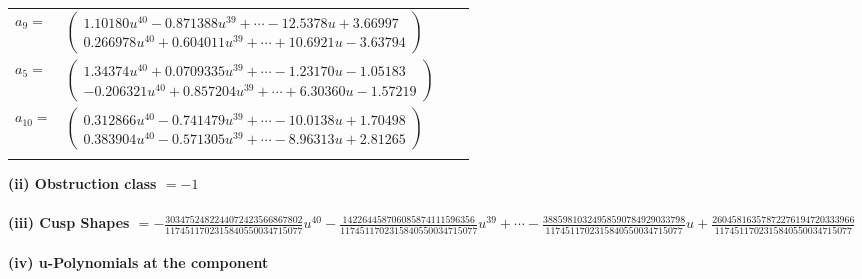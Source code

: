 \documentclass[1p]{elsarticle_modified}
\theoremstyle{definition}
\begin{document}
\begin{tabular}{m{7pt} m{180pt} m{7pt} m{180pt} }
\flushright $a_{9}=$&$\begin{pmatrix}1.10180 u^{40}-0.871388 u^{39}+\cdots-12.5378 u+3.66997\\0.266978 u^{40}+0.604011 u^{39}+\cdots+10.6921 u-3.63794\end{pmatrix}$ \\
\flushright $a_{5}=$&$\begin{pmatrix}1.34374 u^{40}+0.0709335 u^{39}+\cdots-1.23170 u-1.05183\\-0.206321 u^{40}+0.857204 u^{39}+\cdots+6.30360 u-1.57219\end{pmatrix}$ \\
\flushright $a_{10}=$&$\begin{pmatrix}0.312866 u^{40}-0.741479 u^{39}+\cdots-10.0138 u+1.70498\\0.383904 u^{40}-0.571305 u^{39}+\cdots-8.96313 u+2.81265\end{pmatrix}$\\&\end{tabular}
\flushleft \textbf{(ii) Obstruction class $= -1$}\\~\\
\flushleft \textbf{(iii) Cusp Shapes $= -\frac{3034752482244072423566867802}{1174511702315840550034715077} u^{40}-\frac{142264458706085874111596356}{1174511702315840550034715077} u^{39}+\cdots-\frac{38859810324958590784929033798}{1174511702315840550034715077} u+\frac{26045816357872276194720333966}{1174511702315840550034715077}$}\\~\\
\newpage\renewcommand{\arraystretch}{1}
\flushleft \textbf{(iv) u-Polynomials at the component}\newline \\
\end{document}
